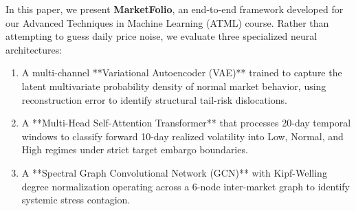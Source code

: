 \documentclass[10pt,twocolumn,letterpaper]{article}
\begin{document}
In this paper, we present \textbf{MarketFolio}, an end-to-end framework developed for our Advanced Techniques in Machine Learning (ATML) course. Rather than attempting to guess daily price noise, we evaluate three specialized neural architectures:
\begin{enumerate}[leftmargin=*]
    \item A multi-channel **Variational Autoencoder (VAE)** trained to capture the latent multivariate probability density of normal market behavior, using reconstruction error to identify structural tail-risk dislocations.
    \item A **Multi-Head Self-Attention Transformer** that processes 20-day temporal windows to classify forward 10-day realized volatility into Low, Normal, and High regimes under strict target embargo boundaries.
    \item A **Spectral Graph Convolutional Network (GCN)** with Kipf-Welling degree normalization operating across a 6-node inter-market graph to identify systemic stress contagion.
\end{enumerate}
\end{document}
